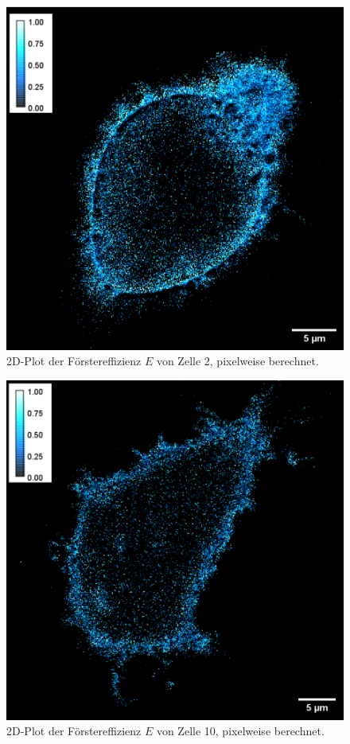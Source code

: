 \begin{figure}[h]
    \centering
    \includegraphics[scale = 0.45]{Bilder/E2.png}
    \caption{2D-Plot der Förstereffizienz $E$ von Zelle 2, pixelweise berechnet.}
    \label{bild:E2}
\end{figure}

\begin{figure}[h]
    \centering
    \includegraphics[scale = 0.45]{Bilder/E10.png}
    \caption{2D-Plot der Förstereffizienz $E$ von Zelle 10, pixelweise berechnet.}
    \label{bild:E10}
\end{figure}

